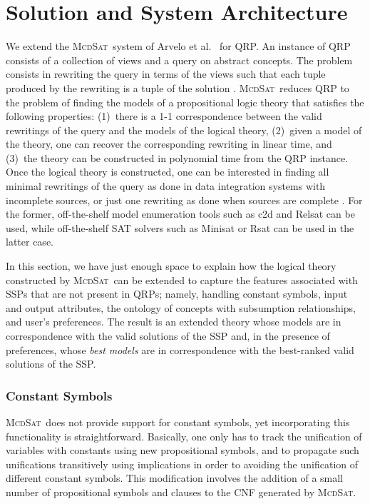 \documentclass{llncs}
\newcommand{\mcdsat}{\textsc{McdSat}}
\begin{document}
\section{Solution and System Architecture}

We extend the \mcdsat\ system of Arvelo et al.\ \cite{arvelo:aaai06} for QRP.
An instance of QRP consists of a collection of views and a query on abstract
concepts.  The problem consists in rewriting the query in terms of the
views such that each tuple produced by the rewriting is a tuple of the
solution \cite{Ullman00}.
\mcdsat\ reduces QRP to the problem of finding the models of a propositional
logic theory that satisfies the following properties:
(1)~there is a 1-1 correspondence between the valid rewritings of the
query and the models of the logical theory,
(2)~given a model of the theory, one can recover the corresponding rewriting
in linear time, and
(3)~the theory can be constructed in polynomial time from the QRP instance.
Once the logical theory is constructed, one can be interested in finding all
minimal rewritings of the query as done in data integration systems with incomplete
sources, or just one rewriting as done when sources are complete \cite{Ullman00}.
For the former, off-the-shelf model enumeration tools such as c2d \cite{c2d} and
Relsat \cite{relsat} can be used, while off-the-shelf SAT solvers such as
Minisat \cite{minisat} or Rsat \cite{knot07lightweight} can be used in the latter case.

In this section, we have just enough space to explain how the logical
theory constructed by \mcdsat\ can be extended to capture the features
associated with SSPs that are not present in QRPs; namely, handling
constant symbols, input and output attributes, the ontology of concepts
with subsumption relationships, and user's preferences. The result is an
extended theory whose models are in correspondence with the valid solutions
of the SSP and, in the presence of preferences, whose \emph{best models}
are in correspondence with the best-ranked valid solutions of the SSP.

\subsubsection{Constant Symbols}

\mcdsat\ does not provide support for constant symbols, yet incorporating
this functionality is straightforward.
Basically, one only has to track the unification of variables with
constants using new propositional symbols, and to propagate such unifications
transitively using implications in order to avoiding the unification of different
constant symbols.
This modification involves the addition of a small number of propositional
symbols and clauses to the CNF generated by \mcdsat.
\end{document}
